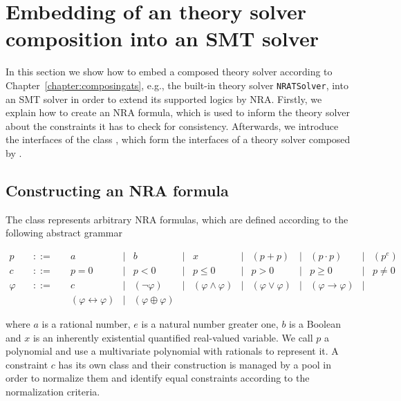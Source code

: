 \chapter{Embedding of an \smtrat theory solver composition into an SMT solver}
\label{chapter:embeddingats}
In this section we show how to embed a composed theory solver according
to Chapter~\ref{chapter:composingats}, e.g., the built-in theory 
solver \texttt{NRATSolver}, into an SMT solver in order to 
extend its supported logics by NRA. Firstly, we explain how to
create an NRA formula, which is used to inform the theory solver about the
constraints it has to check for consistency. Afterwards, we introduce the 
interfaces of the class \managerClass, which form the interfaces of
a theory solver composed by \smtrat.

\section{Constructing an NRA formula}
The class \formulaClass represents arbitrary NRA formulas, which are
defined according to the following abstract grammar

\[
\begin{array}{rccccccccccccc}
  p &\quad ::=\quad & a & | & b & | & x & | & (p + p) & | & (p \cdot p) & | & (p^e) \\
  c &\quad ::=\quad & p = 0 & | & p < 0 & | & p \leq 0 & | & p > 0 & | & p \geq 0 & | & p \neq 0 \\
 \varphi &\quad ::=\quad & c & | & (\neg \varphi) & | &
 (\varphi\land\varphi) & | &
 (\varphi\lor\varphi) & | & 
 (\varphi\rightarrow\varphi) & | \\ &&
 (\varphi\leftrightarrow\varphi) & | &
 (\varphi\oplus\varphi)
\end{array}
\]

where $a$ is a rational number, $e$ is a natural number greater one, $b$ is a Boolean  and $x$ is an inherently existential 
quantified real-valued variable. We call $p$ a polynomial and use a \carl multivariate polynomial with \cln rationals to represent it. A constraint $c$
has its own \Cpp class and their construction is managed by a pool in order to normalize them and identify
equal constraints according to the normalization criteria. 

